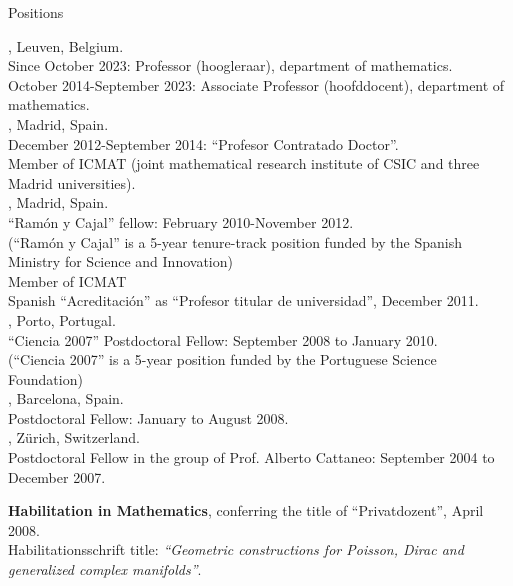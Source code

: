 \documentclass[12p]{resume}
\begin{document}
\begin{category}{Positions}

, Leuven, Belgium.\\
Since October 2023: Professor (hoogleraar), department of mathematics.\\ 
October 2014-September 2023: Associate Professor (hoofddocent), department of mathematics.\\ 

, Madrid, Spain.\\
December 2012-September 2014: ``Profesor Contratado Doctor''.\\
Member of ICMAT (joint mathematical research institute of CSIC and   three Madrid universities).\\
 
 , Madrid, Spain.\\
``Ram\'on y Cajal'' fellow:
February 2010-November 2012.\\
(``Ram\'on y Cajal'' is a 5-year tenure-track position funded by the Spanish Ministry for Science and Innovation)\\
Member of ICMAT\\ 
Spanish ``Acreditaci\'on'' as ``Profesor titular de universidad'', December 2011.\\

, Porto, Portugal.\\
``Ciencia 2007'' Postdoctoral Fellow: September 2008 to January 2010.\\
(``Ciencia 2007''   is a 5-year position funded by the    Portuguese Science Foundation)\\ 

, Barcelona, Spain.\\
Postdoctoral Fellow: January to August 2008. \\
 
, Z\"urich, Switzerland.\\
Postdoctoral Fellow in the group of Prof. Alberto Cattaneo: September 2004 to December 2007. 

\vspace{1mm}
\textbf{Habilitation in Mathematics}, conferring the title of ``Privatdozent'', April 2008.\\
Habilitationsschrift title:  \emph{``Geometric constructions for Poisson, Dirac and generalized complex manifolds''}.\\
\end{category}
 
\end{document}
